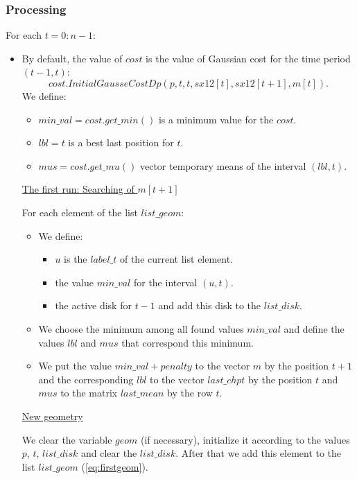 \documentclass{report}
\begin{document}
	\subsubsection*{Processing}

	For each $t = 0:n-1$:
	\begin{itemize}
	\item By default, the value of $cost$ is the value of Gaussian cost for the time period $(t-1,t)$:
	\begin{equation*}
		cost.InitialGausseCostDp(p, t, t, sx12[t], sx12[t+1], m[t]).
	\end{equation*}
	 We define:
		\begin{itemize}
			\item $min\_val = cost.get\_min()$  is a minimum value for  the  $cost$.
			\item $lbl = t$ is a best last position for $t$.
			\item $mus = cost.get\_mu()$ vector temporary means of the interval $(lbl, t)$.
	\end{itemize}
	
	\underline {The first run: Searching of $m[t+1]$}
	
	For each element of the list $list\_geom$:
	\begin{itemize}
		\item  We define:
		\begin{itemize}
			\item $u$ is the $label\_t$ of the current list element.
			\item the value $min\_val$ for the interval $(u, t)$.
			\item the active disk for $t-1$ and add this disk to the $list\_disk$.
		\end{itemize}
		\item We choose the minimum  among all found values ${min\_val}$ and define the values $lbl$ and $mus$ that correspond this minimum.
		
		\item We put the value $min\_val + penalty$ to the vector $m$  by the position $t+1$ and the corresponding $lbl$ to the vector $last\_chpt$ by the position $t$ and $mus$ to the matrix $last\_mean$  by the row $t$.
	\end{itemize}
	\underline {New geometry}
	
	We clear the variable $geom$ (if necessary), initialize it  according to the values $p$, $t$, $list\_disk$ and  clear the $list\_disk$. After that we add this element to the list $list\_geom$ (\ref{eq:firstgeom}). 
	 

\end{itemize}
\end{document}
